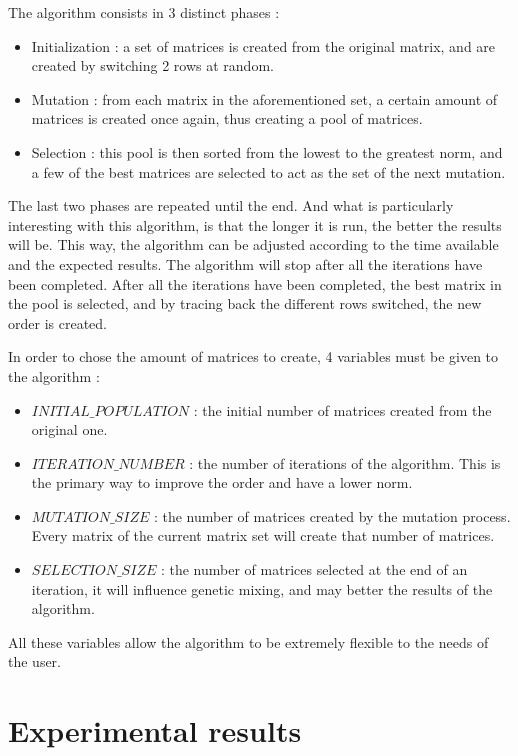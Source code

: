 \documentclass[12pt]{report}
\begin{document}
The algorithm consists in 3 distinct phases :

\begin{itemize}
  \item Initialization : a set of matrices is created from the original matrix, and are created by switching 2 rows at random.
  \item Mutation : from each matrix in the aforementioned set, a certain amount of matrices is created once again, thus creating a pool of matrices.
  \item Selection : this pool is then sorted from the lowest to the greatest norm, and a few of the best matrices are selected to act as the set of the next mutation.
\end{itemize}

The last two phases are repeated until the end. And what is particularly interesting with this algorithm, is that the longer it is run, the better the results will be. This way, the algorithm can be adjusted according to the time available and the expected results. The algorithm will stop after all the iterations have been completed.
After all the iterations have been completed, the best matrix in the pool is selected, and by tracing back the different rows switched, the new order is created.

In order to chose the amount of matrices to create, 4 variables must be given to the algorithm :

\begin{itemize}
  \item $INITIAL\_POPULATION$ : the initial number of matrices created from the original one.
  \item $ITERATION\_NUMBER$ : the number of iterations of the algorithm. This is the primary way to improve the order and have a lower norm.
  \item $MUTATION\_SIZE$ : the number of matrices created by the mutation process. Every matrix of the current matrix set will create that number of matrices.
  \item $SELECTION\_SIZE$ : the number of matrices selected at the end of an iteration, it will influence genetic mixing, and may better the results of the algorithm.
\end{itemize}

All these variables allow the algorithm to be extremely flexible to the needs of the user. 

\chapter{Experimental results}
\end{document}
